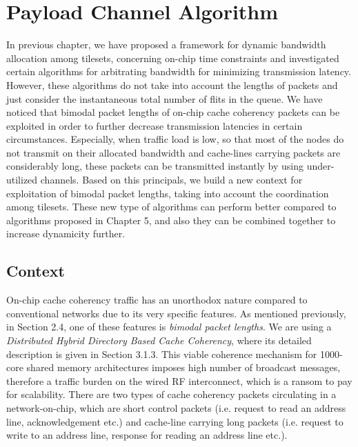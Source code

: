 
\chapter{Payload Channel Algorithm} %

\label{Chapter6} %




In previous chapter, we have proposed a framework for dynamic bandwidth allocation among tilesets, concerning on-chip time constraints and investigated certain algorithms for arbitrating bandwidth for minimizing transmission latency. However, these algorithms do not take into account the lengths of packets and just consider the instantaneous total number of flits in the queue.  We have noticed that bimodal packet lengths of on-chip cache coherency packets can be exploited in order to further decrease transmission latencies in certain circumstances. Especially, when traffic load is low, so that most of the nodes do not transmit on their allocated bandwidth and cache-lines carrying packets are considerably long, these packets can be transmitted instantly by using under-utilized channels. Based on this principals, we build a new context for exploitation of bimodal packet lengths, taking into account the coordination among tilesets. These new type of algorithms can perform better compared to algorithms proposed in Chapter 5, and also they can be combined together to increase dynamicity further. 


\section{Context}

On-chip cache coherency traffic has an unorthodox nature compared to conventional networks due to its very specific features. As mentioned previously, in Section 2.4, one of these features is \textit{bimodal packet lengths}. We are using a \textit{Distributed Hybrid Directory Based Cache Coherency}, where its detailed description is given in Section 3.1.3. This viable coherence mechanism for 1000-core shared memory architectures imposes high number of broadcast messages, therefore a traffic burden on the wired RF interconnect, which is a ransom to pay for scalability. There are two types of cache coherency packets circulating in a network-on-chip, which are short control packets (i.e. request to read an address line, acknowledgement etc.) and cache-line carrying long packets (i.e. request to write to an address line, response for reading an address line etc.).

